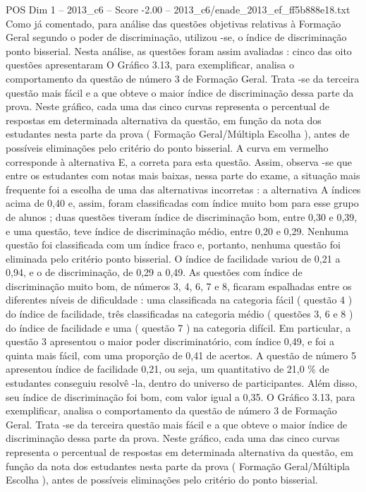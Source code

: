 \begin{textsample}{POS Dim 1 – 2013\_c6 – Score -2.00 – 2013\_c6/enade\_2013\_ef\_ff5b888e18.txt}
Como já comentado, para análise das questões objetivas relativas à Formação Geral segundo o poder de discriminação, utilizou -se, o índice de discriminação ponto bisserial.
Nesta análise, as questões foram assim avaliadas : cinco das oito questões apresentaram O Gráfico 3.13, para exemplificar, analisa o comportamento da questão de número 3 de Formação Geral.
Trata -se da terceira questão mais fácil e a que obteve o maior índice de discriminação dessa parte da prova.
Neste gráfico, cada uma das cinco curvas representa o percentual de respostas em determinada alternativa da questão, em função da nota dos estudantes nesta parte da prova ( Formação Geral/Múltipla Escolha ), antes de possíveis eliminações pelo critério do ponto bisserial.
A curva em vermelho corresponde à alternativa E, a correta para esta questão.
Assim, observa -se que entre os estudantes com notas mais baixas, nessa parte do exame, a situação mais frequente foi a escolha de uma das alternativas incorretas : a alternativa A índices acima de 0,40 e, assim, foram classificadas com índice muito bom para esse grupo de alunos ; duas questões tiveram índice de discriminação bom, entre 0,30 e 0,39, e uma questão, teve índice de discriminação médio, entre 0,20 e 0,29.
Nenhuma questão foi classificada com um índice fraco e, portanto, nenhuma questão foi eliminada pelo critério ponto bisserial.
O índice de facilidade variou de 0,21 a 0,94, e o de discriminação, de 0,29 a 0,49.
As questões com índice de discriminação muito bom, de números 3, 4, 6, 7 e 8, ficaram espalhadas entre os diferentes níveis de dificuldade : uma classificada na categoria fácil ( questão 4 ) do índice de facilidade, três classificadas na categoria médio ( questões 3, 6 e 8 ) do índice de facilidade e uma ( questão 7 ) na categoria difícil.
Em particular, a questão 3 apresentou o maior poder discriminatório, com índice 0,49, e foi a quinta mais fácil, com uma proporção de 0,41 de acertos.
A questão de número 5 apresentou índice de facilidade 0,21, ou seja, um quantitativo de 21,0 \% de estudantes conseguiu resolvê -la, dentro do universo de participantes.
Além disso, seu índice de discriminação foi bom, com valor igual a 0,35.
O Gráfico 3.13, para exemplificar, analisa o comportamento da questão de número 3 de Formação Geral.
Trata -se da terceira questão mais fácil e a que obteve o maior índice de discriminação dessa parte da prova.
Neste gráfico, cada uma das cinco curvas representa o percentual de respostas em determinada alternativa da questão, em função da nota dos estudantes nesta parte da prova ( Formação Geral/Múltipla Escolha ), antes de possíveis eliminações pelo critério do ponto bisserial.

\end{textsample}
